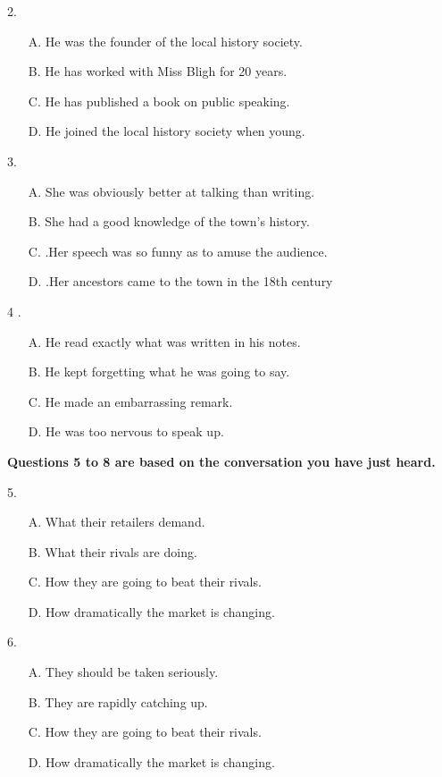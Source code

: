 \documentclass[UTF8,11pt]{ctexart}
\begin{document}
2.


\begin{itemize}[leftmargin=2em,itemsep=.2em,topsep=.4em]\item[A.] He was the founder of the local history society.
\item[B.] He has worked with Miss Bligh for 20 years.
\item[C.] He has published a book on public speaking.
\item[D.] He joined the local history society when young.
\end{itemize}

3.


\begin{itemize}[leftmargin=2em,itemsep=.2em,topsep=.4em]\item[A.] She was obviously better at talking than writing.
\item[B.] She had a good knowledge of the town’s history.
\item[C.] .Her speech was so funny as to amuse the audience.
\item[D.] .Her ancestors came to the town in the 18th century
\end{itemize}

4 .


\begin{itemize}[leftmargin=2em,itemsep=.2em,topsep=.4em]\item[A.] He read exactly what was written in his notes.
\item[B.] He kept forgetting what he was going to say.
\item[C.] He made an embarrassing remark.
\item[D.] He was too nervous to speak up.
\end{itemize}

\textbf{Questions 5 to 8 are based on the conversation you have just heard.}


5.


\begin{itemize}[leftmargin=2em,itemsep=.2em,topsep=.4em]\item[A.] What their retailers demand.
\item[B.] What their rivals are doing.
\item[C.] How they are going to beat their rivals.
\item[D.] How dramatically the market is changing.
\end{itemize}

6.


\begin{itemize}[leftmargin=2em,itemsep=.2em,topsep=.4em]\item[A.] They should be taken seriously.
\item[B.] They are rapidly catching up.
\item[C.] How they are going to beat their rivals.
\item[D.] How dramatically the market is changing.
\end{itemize}
\end{document}

